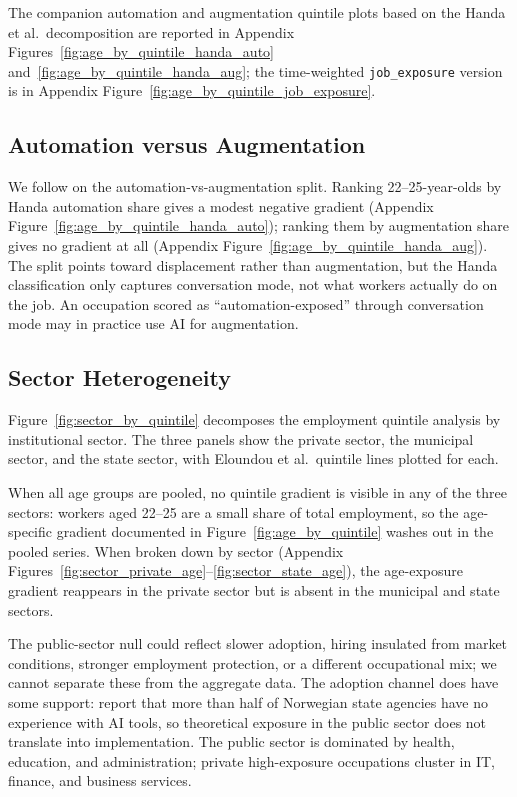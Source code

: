 The companion automation and augmentation quintile plots based on the Handa et al.\ decomposition are reported in Appendix Figures~\ref{fig:age_by_quintile_handa_auto} and~\ref{fig:age_by_quintile_handa_aug}; the time-weighted \citet{anthropic2026} \texttt{job\_exposure} version is in Appendix Figure~\ref{fig:age_by_quintile_job_exposure}.


\subsection{Automation versus Augmentation}\label{sec:results:auto_aug}

We follow \citet{brynjolfsson2025} on the automation-vs-augmentation split. Ranking 22--25-year-olds by Handa automation share gives a modest negative gradient (Appendix Figure~\ref{fig:age_by_quintile_handa_auto}); ranking them by augmentation share gives no gradient at all (Appendix Figure~\ref{fig:age_by_quintile_handa_aug}). The split points toward displacement rather than augmentation, but the Handa classification only captures conversation mode, not what workers actually do on the job. An occupation scored as ``automation-exposed'' through conversation mode may in practice use AI for augmentation. 


\subsection{Sector Heterogeneity}\label{sec:results:sectors}

Figure~\ref{fig:sector_by_quintile} decomposes the employment quintile analysis by institutional sector. The three panels show the private sector, the municipal sector, and the state sector, with Eloundou et al.\ quintile lines plotted for each.

When all age groups are pooled, no quintile gradient is visible in any of the three sectors: workers aged 22--25 are a small share of total employment, so the age-specific gradient documented in Figure~\ref{fig:age_by_quintile} washes out in the pooled series. When broken down by sector (Appendix Figures~\ref{fig:sector_private_age}--\ref{fig:sector_state_age}), the age-exposure gradient reappears in the private sector but is absent in the municipal and state sectors.

The public-sector null could reflect slower adoption, hiring insulated from market conditions, stronger employment protection, or a different occupational mix; we cannot separate these from the aggregate data. The adoption channel does have some support: \citet{riksrevisjonen2024} report that more than half of Norwegian state agencies have no experience with AI tools, so theoretical exposure in the public sector does not translate into implementation. The public sector is dominated by health, education, and administration; private high-exposure occupations cluster in IT, finance, and business services. 

